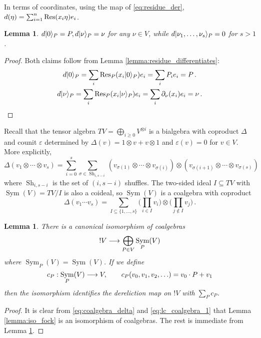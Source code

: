 \documentclass[english,letter paper,12pt,reqno]{article}
\DeclarePairedDelimiter\ket{\lvert}{\rangle}
\newtheorem{lemma}[theorem]{Lemma}
\theoremstyle{example}
\numberwithin{equation}{section}
\DeclareMathOperator{\Sym}{Sym}
\begin{document}
In terms of coordinates, using the map of \eqref{eq:residue_der}, $d( \eta ) = \sum_{i=1}^n \operatorname{Res}\!\,( x_i \eta ) e_i$.

\begin{lemma}\label{lemma:dereliction_describe} $d \ket{0}_P = P, d \ket{\nu}_P = \nu$ for any $\nu \in V$, while $d \ket{\nu_1,\ldots,\nu_s}_P = 0$ for $s > 1$.
\end{lemma}
\begin{proof}
Both claims follow from Lemma \ref{lemma:residue_differentiates}:
\begin{gather*}
d \ket{0}_P = \sum_i \Res_P( x_i \ket{0}_P ) e_i = \sum_i P_i e_i = P\,.\\
d \ket{\nu}_P = \sum_i \Res_P( x_i \ket{\nu}_P ) e_i = \sum_i \partial_\nu( x_i ) e_i = \nu\,.
\end{gather*}
\end{proof}

Recall that the tensor algebra $TV = \bigoplus_{i \ge 0} V^{\otimes i}$ is a bialgebra with coproduct $\Delta$ and counit $\varepsilon$ determined by $\Delta(v) = 1 \otimes v + v \otimes 1$ and $\varepsilon(v) = 0$ for $v \in V$. More explicitly,
\begin{equation}
\Delta(v_1 \otimes \cdots \otimes v_s) = \sum_{i=0}^s \sum_{\sigma \in \operatorname{Sh}_{i,s-i}} ( v_{\sigma(1)} \otimes \cdots \otimes v_{\sigma(i)} ) \otimes ( v_{\sigma(i+1)} \otimes \cdots \otimes v_{\sigma(s)} )
\end{equation}
where $\operatorname{Sh}_{i,s-i}$ is the set of $(i,s-i)$ shuffles. The two-sided ideal $I \subseteq TV$ with $\Sym(V) = TV/I$ is also a coideal, so $\Sym(V)$ is a coalgebra with coproduct
\begin{equation}\label{eq:coalgebra_delta}
\Delta( v_1 \cdots v_s ) = \sum_{I \subseteq \{1,\ldots,s\}} \Big(\prod_{i \in I} v_i\Big) \otimes \Big(\prod_{j \notin I} v_j\Big)\,.
\end{equation}

\begin{lemma}\label{lemma:relate_to_fock} There is a canonical isomorphism of coalgebras
\begin{equation}
{!} V \lto \bigoplus_{P \in V} \Sym_P(V)
\end{equation}
where $\Sym_P(V) = \Sym(V)$. If we define
\[
c_P: \Sym_P(V) \lto V, \qquad c_P( v_0, v_1, v_2, \ldots ) = v_0 \cdot P + v_1
\]
then the isomorphism identifies the dereliction map on ${!} V$ with $\sum_P c_P$.
\end{lemma}
\begin{proof}
It is clear from \eqref{eq:coalgebra_delta} and \eqref{eq:lc_coalgebra_1} that Lemma \ref{lemma:iso_fock} is an isomorphism of coalgebras. The rest is immediate from Lemma \ref{lemma:dereliction_describe}.
\end{proof}
\end{document}
